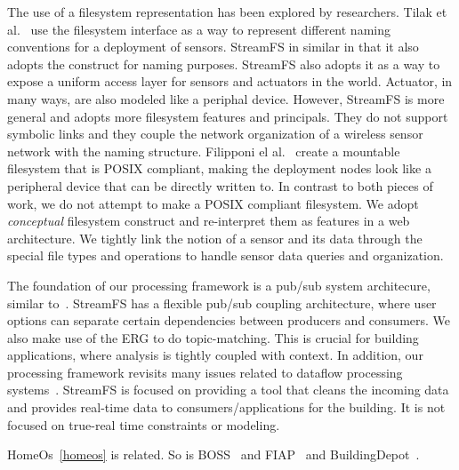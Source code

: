 The use of a filesystem representation has been explored by researchers.  Tilak et al.~\cite{BingFS} use the filesystem 
interface as a way to represent different naming conventions for a deployment of sensors.	StreamFS in similar in that it also 
adopts the construct for naming purposes.  StreamFS also adopts it as a way to expose a uniform access layer for sensors and
actuators in the world.  Actuator, in many ways, are also modeled like a periphal device.
However, StreamFS is more general and adopts more filesystem features and principals.
They do not support symbolic links and they couple the network organization of a wireless sensor network with the naming structure.
Filipponi el al.~\cite{wsnfuse} create a mountable filesystem that is POSIX compliant, making the deployment nodes
look like a peripheral device that can be directly written to.  In contrast to both pieces of work, we do not attempt
to make a POSIX compliant filesystem.  We adopt \emph{conceptual} filesystem construct and re-interpret them as features in 
a web architecture.  We tightly link the notion of a sensor and its data through the special file types and operations to 
handle sensor data queries and organization.




The foundation of our processing framework is a pub/sub system architecure, similar 
to~\cite{Eugster01contentbasedpubsub, Rosenblum97adesign, tspaces, tibco}.  StreamFS has a flexible pub/sub coupling architecture,
where user options can separate certain dependencies between producers and consumers.  We also make use of the ERG to 
do topic-matching.  This is crucial for building applications, where analysis is tightly coupled with context.
In addition, our processing framework revisits many issues related to dataflow processing systems~\cite{CullerCSD92716,ptolemy2001,ptolemy2007}.
StreamFS is focused on providing a tool that cleans the incoming data and provides real-time data to consumers/applications
for the building.  It is not focused on true-real time constraints or modeling.


HomeOs~\ref{homeos} is related.  So is BOSS~\cite{boss} and FIAP~\cite{fiap} and BuildingDepot~\cite{bdepot}.








